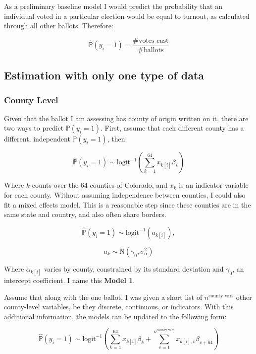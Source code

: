 \documentclass[12pt,twoside]{reedthesis}
\begin{document}
  As a preliminary baseline model I would predict the probability that an
  individual voted in a particular election would be equal to turnout, as
  calculated through all other ballots. Therefore:
  
  \[\hat{\mathbb{P}}(y_i = 1) = \frac{\# \text{votes cast}}{\# \text{ballots}}\]
  
  \subsection{Estimation with only one type of
  data}\label{estimation-with-only-one-type-of-data}
  
  \subsubsection{County Level}\label{county-level}
  
  Given that the ballot I am assessing has county of origin written on it,
  there are two ways to predict \(\mathbb{P}(y_i = 1)\). First, assume
  that each different county has a different, independent
  \(\mathbb{P}(y_i = 1)\), then:
  
  \[\hat{\mathbb{P}}(y_i = 1) \sim \text{logit}^{-1}(\sum_{k = 1}^{64}x_{k[i]}\beta_{k})\]
  
  Where \(k\) counts over the 64 counties of Colorado, and \(x_{k}\) is an
  indicator variable for each county. Without assuming independence
  between counties, I could also fit a mixed effects model. This is a
  reasonable step since these counties are in the same state and country,
  and also often share borders.
  
  \begin{equation} \tag{Model 1}
  \hat{\mathbb{P}}(y_i = 1) \sim \text{logit}^{-1}(a_{k[i]}),
  \end{equation}
  
  \[a_{k} \sim \text{N}(\gamma_0, \sigma_{\alpha}^2)\]
  
  Where \(\alpha_{k[i]}\) varies by county, constrained by its standard
  deviation and \(\gamma_0\), an intercept coefficient. I name this
  \textbf{Model 1}.
  
  Assume that along with the one ballot, I was given a short list of
  \(n^{\text{county vars}}\) other county-level variables, be they
  discrete, continuous, or indicators. With this additional information,
  the models can be updated to the following form:
  
  \[\hat{\mathbb{P}}(y_i = 1) \sim \text{logit}^{-1}(\sum_{k = 1}^{64}x_{k[i]}\beta_{k} + \sum_{v=1}^{n^{\text{county vars}}}x_{k[i], v}\beta_{v+64})\]
  
\end{document}
